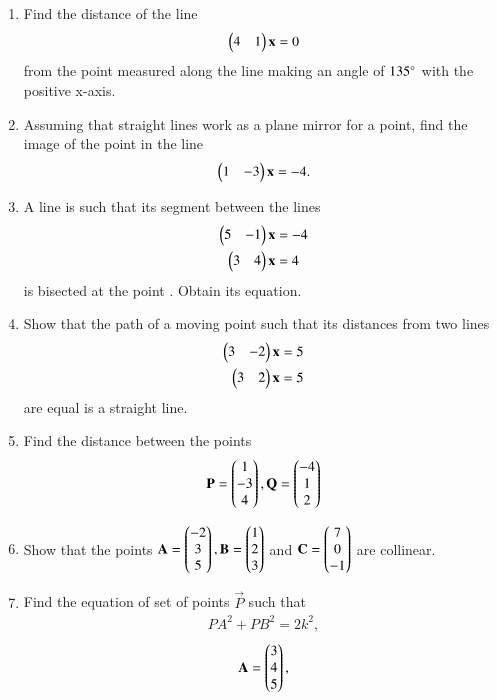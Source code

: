 \begin{enumerate}[label=\arabic*.,ref=\thesubsection.\theenumi]
%
\item Find the distance of the line
\begin{align}
\begin{pmatrix}4 & 1\end{pmatrix}\mathbf{x}  = 0
\end{align}
%
from the point  measured along the line making an angle of $135\degree$ with the positive x-axis.
\item Assuming that straight lines work as a plane mirror for a point, find the image of the point  in the line 
%
\begin{align}
\begin{pmatrix}1 & -3\end{pmatrix}\mathbf{x}  = -4.
\end{align}
%
\item A line is such that its segment between the lines %
\begin{align}
\begin{pmatrix}5 & -1\end{pmatrix}\mathbf{x}  &= -4
\\
\begin{pmatrix}3 & 4\end{pmatrix}\mathbf{x}  &= 4
\end{align}
%
is bisected at the point .  Obtain its equation.
%
\item Show that the path of a moving point such that its distances from two lines
%
\begin{align}
\begin{pmatrix}3 & -2\end{pmatrix}\mathbf{x}  &= 5
\\
\begin{pmatrix}3 & 2\end{pmatrix}\mathbf{x}  &= 5
\end{align}
%
are  equal is a straight line.
%
\item Find the distance between the points
%
\begin{align}
\mathbf{P} = \begin{pmatrix}1\\-3\\4\end{pmatrix},
\mathbf{Q} = \begin{pmatrix}-4\\1\\2\end{pmatrix}
\end{align}
%
\item Show that the points 
$
\mathbf{A}=\begin{pmatrix}-2\\3\\5\end{pmatrix}, 
\mathbf{B}=\begin{pmatrix}1\\2\\3\end{pmatrix}$ 
and 
$ \mathbf{C}=\begin{pmatrix}7\\0\\-1\end{pmatrix}$ 
are collinear.
%
\item Find the equation of set of points $\vec{P}$ such that
\begin{align}
PA^2+PB^2 =2k^2,
\end{align}
%
\begin{align}
\vec{A} = \myvec{3\\4 \\5},

\end{align}
\end{enumerate}
